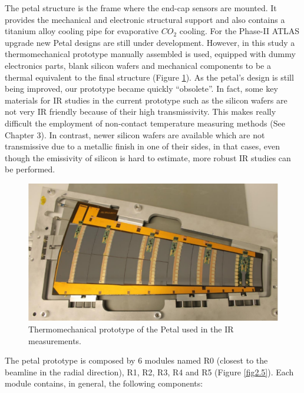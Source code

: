 		The petal structure is the frame where the end-cap sensors are mounted. It provides the mechanical and electronic structural support and also contains a titanium alloy cooling pipe for evaporative $CO_{2}$ cooling. For the Phase-II ATLAS upgrade new Petal designs are still under development. However, in this study a thermomechanical prototype manually assembled is used, equipped with dummy electronics parts, blank silicon wafers and mechanical components to be a thermal equivalent to the final structure (Figure \ref{fig2.4}). As the petal's design is still being improved, our prototype became quickly “obsolete”. In fact, some key materials for IR studies in the current prototype such as the silicon wafers are not very IR friendly because of their high transmissivity. This makes really difficult the employment of non-contact temperature measuring methods (See Chapter 3). In contrast, newer silicon wafers are available which are not transmissive due to a metallic finish in one of their sides, in that cases, even though the emissivity of silicon is hard to estimate, more robust IR studies can be performed.
		
		\begin{figure}[ht!]
			\centering
			\captionsetup{justification=centering,margin=2cm}
			\includegraphics[scale=0.35]{Figures/Chapter02/PetalConstruction.pdf}
			\caption{Thermomechanical prototype of the Petal used in the IR measurements.}\label{fig2.4}
		\end{figure}
		
		The petal prototype is composed by 6 modules named R0 (closest to the beamline in the radial direction), R1, R2, R3, R4 and R5 (Figure \ref{fig2.5}). Each module contains, in general, the following components:
		
